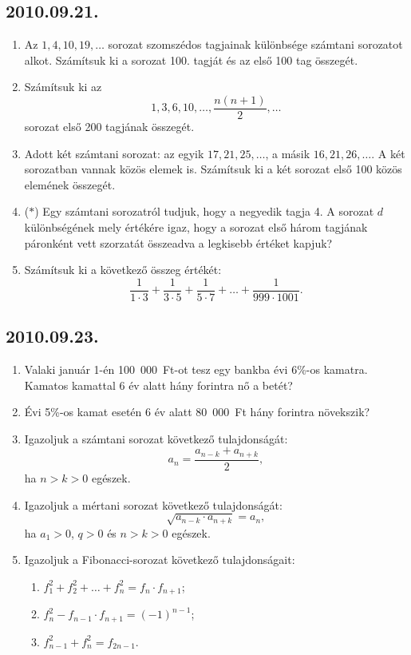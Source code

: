 \documentclass{article}
\newenvironment{abc}{\begin{enumerate}[label=\textit{\alph*})]}{\end{enumerate}}
\begin{document}
\subsection*{2010.09.21.}
\begin{enumerate}
\item Az $1,4,10,19,\ldots$ sorozat szomszédos tagjainak különbsége számtani sorozatot alkot. Számítsuk ki a sorozat 100. tagját és az első 100 tag összegét.
\item Számítsuk ki az
$$1,3,6,10,\ldots,\frac{n(n+1)}{2},\ldots$$
sorozat első 200 tagjának összegét.
\item Adott két számtani sorozat: az egyik
$17,21,25,\ldots$, a másik $16,21,26,\ldots$. A két sorozatban vannak közös elemek is. Számítsuk ki a két sorozat első 100 közös elemének összegét.
\item ($*$) Egy számtani sorozatról tudjuk, hogy a negyedik tagja 4. A sorozat $d$ különbségének mely értékére igaz, hogy a sorozat első három tagjának páronként vett szorzatát összeadva a legkisebb értéket kapjuk?
\item Számítsuk ki a következő összeg értékét:
$$\frac{1}{1\cdot 3}+\frac{1}{3\cdot 5}
+\frac{1}{5\cdot 7}+\ldots+\frac{1}{999\cdot 1001}.$$
\end{enumerate}


\subsection*{2010.09.23.}
\begin{enumerate}
\item Valaki január 1-én 100~000~Ft-ot tesz egy bankba évi 6\%-os kamatra. Kamatos kamattal 6 év alatt hány forintra nő a betét?
\item Évi 5\%-os kamat esetén 6 év alatt 80~000~Ft hány forintra növekszik?
\item Igazoljuk a számtani sorozat következő tulajdonságát:
$$a_n=\frac{a_{n-k}+a_{n+k}}{2},$$
ha $n>k>0$ egészek.
\item Igazoljuk a mértani sorozat következő tulajdonságát:
$$\sqrt{a_{n-k}\cdot a_{n+k}}=a_n,$$
ha $a_1>0$, $q>0$ és $n>k>0$ egészek.
\item Igazoljuk a Fibonacci-sorozat következő tulajdonságait:
\begin{abc}
\item $f_1^2+f_2^2+\ldots+f_n^2=f_n\cdot f_{n+1}$;
\item $f_n^2-f_{n-1}\cdot f_{n+1}=(-1)^{n-1}$;
\item $f_{n-1}^2+f_n^2=f_{2n-1}$.
\end{abc}
\end{enumerate}
\end{document}
